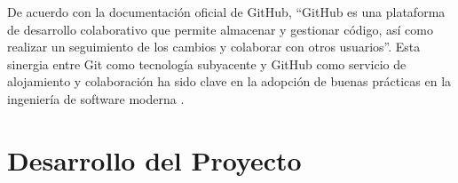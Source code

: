 \documentclass[12pt,letterpaper,spanish]{report}
\begin{document}
De acuerdo con la documentación oficial de GitHub, ``GitHub es una plataforma de desarrollo colaborativo que permite almacenar y gestionar código, así como realizar un seguimiento de los cambios y colaborar con otros usuarios''. Esta sinergia entre Git como tecnología subyacente y GitHub como servicio de alojamiento y colaboración ha sido clave en la adopción de buenas prácticas en la ingeniería de software moderna \cite{githubdocs}.



%





\chapter{Desarrollo del Proyecto}
\newpage
\end{document}
